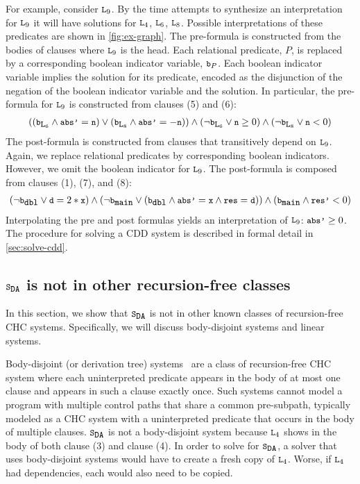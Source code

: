 For example, consider $\cc{L}_9$. By the time \sys attempts to
synthesize an interpretation for $\cc{L}_9$ it will have solutions for
$\cc{L}_4$, $\cc{L}_6$, $\cc{L}_8$.
%
Possible interpretations of these predicates are shown in
\autoref{fig:ex-graph}.
%
The pre-formula is constructed from the bodies of clauses where
$\cc{L}_9$ is the head.
%
Each relational predicate, $P$,
is replaced by a corresponding boolean indicator variable, $\cc{b}_P$.
%
Each boolean indicator variable implies the solution for its
predicate,
encoded as the disjunction of the negation of the boolean
indicator variable and the solution.
%
In particular, the pre-formula for $\cc{L}_9$ is constructed from
clauses (5) and (6):
\begin{gather}
  ((\cc{b}_{\cc{L}_6} \land \cc{abs'} = \cc{n})
  \lor
  (\cc{b}_{\cc{L}_8} \land \cc{abs'} = -\cc{n}))
  \land
  (\neg \cc{b}_{\cc{L}_6} \lor \cc{n} \ge 0)
  \land
  (\neg \cc{b}_{\cc{L}_8} \lor \cc{n} < 0)
\end{gather}
%
The post-formula is constructed from clauses that transitively depend
on $\cc{L}_9$. Again, we replace relational predicates by
corresponding boolean indicators. However, we omit the boolean indicator for
$\cc{L}_9$. The post-formula is composed from clauses (1), (7), and
(8):
\begin{gather}
  (\neg \cc{b}_{\cc{dbl}} \lor \cc{d} = 2*\cc{x})
  \land
  (\neg \cc{b}_{\cc{main}} \lor
    (\cc{b}_{\cc{dbl}}
    \land \cc{abs'}= \cc{x}
    \land \cc{res}=\cc{d} ))
  \land
  (\cc{b}_{\cc{main}} \land \cc{res'} < 0)
\end{gather}
%
Interpolating the pre and post formulas yields an interpretation
of $\cc{L}_9$: $\cc{abs'} \geq 0$.
%
The procedure for solving a CDD system is described in formal detail
in \autoref{sec:solve-cdd}.

\subsection{$\mcchc$ is not in other recursion-free classes}
\label{sec:not-in}
%
In this section, we show that $\mcchc$ is not in other
known classes of recursion-free CHC systems. 
%
Specifically, we will
discuss body-disjoint systems and linear systems.
%

Body-disjoint (or derivation tree)
systems~\cite{mcmillan14,bjorner13,heizmann10,rummer13a,rummer13b} are
a class of recursion-free CHC system where each uninterpreted
predicate appears in the body of at most one clause and appears in
such a clause exactly once.
%
Such systems cannot model a program with multiple control paths that
share a common pre-subpath, typically modeled as a CHC system with a
uninterpreted predicate that occurs in the body of multiple clauses.
%
$\mcchc$ is not a body-disjoint system because $\cc{L}_4$ shows in the
body of both clause (3) and clause (4).
%
In order to solve for $\mcchc$, a solver that uses
body-disjoint systems would have to create a fresh copy of
$\cc{L}_4$. 
%
Worse, if $\cc{L}_4$ had dependencies, each would also need to be copied.

